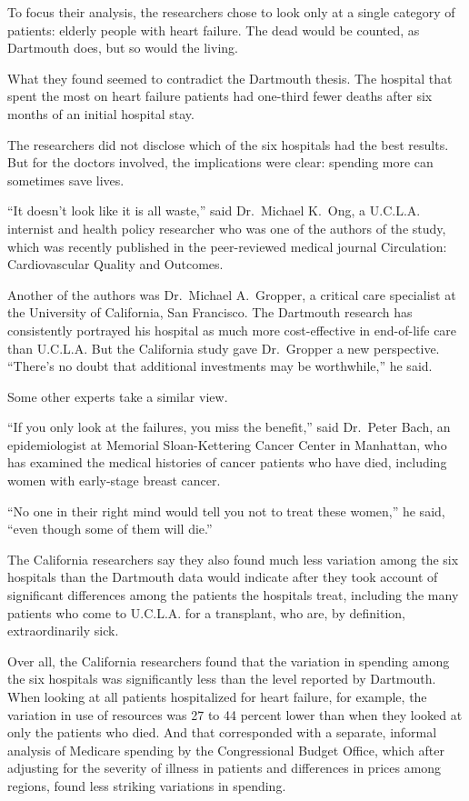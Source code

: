 ﻿\documentclass[12pt]{article}
\begin{document}
To focus their analysis, the researchers chose to look only at a single category of patients:
elderly people with heart failure. The dead would be counted, as Dartmouth does, but so would the
living.

What they found seemed to contradict the Dartmouth thesis. The hospital that spent the most on heart
failure patients had one-third fewer deaths after six months of an initial hospital stay.

The researchers did not disclose which of the six hospitals had the best results. But for the
doctors involved, the implications were clear: spending more can sometimes save lives.

``It doesn't look like it is all waste,'' said Dr.~Michael K.~Ong, a U.C.L.A. internist and health
policy researcher who was one of the authors of the study, which was recently published in the
peer-reviewed medical journal Circulation: Cardiovascular Quality and Outcomes.

Another of the authors was Dr.~Michael A.~Gropper, a critical care specialist at the University of
California, San Francisco. The Dartmouth research has consistently portrayed his hospital as much
more cost-effective in end-of-life care than U.C.L.A. But the California study gave Dr.~Gropper a
new perspective. ``There's no doubt that additional investments may be worthwhile,'' he said.

Some other experts take a similar view.

``If you only look at the failures, you miss the benefit,'' said Dr.~Peter Bach, an epidemiologist
at Memorial Sloan-Kettering Cancer Center in Manhattan, who has examined the medical histories of
cancer patients who have died, including women with early-stage breast cancer.

``No one in their right mind would tell you not to treat these women,'' he said, ``even though some
of them will die.''

The California researchers say they also found much less variation among the six hospitals than the
Dartmouth data would indicate after they took account of significant differences among the patients
the hospitals treat, including the many patients who come to U.C.L.A. for a transplant, who are, by
definition, extraordinarily sick.

Over all, the California researchers found that the variation in spending among the six hospitals
was significantly less than the level reported by Dartmouth. When looking at all patients
hospitalized for heart failure, for example, the variation in use of resources was 27 to 44 percent
lower than when they looked at only the patients who died. And that corresponded with a separate,
informal analysis of Medicare spending by the Congressional Budget Office, which after adjusting for
the severity of illness in patients and differences in prices among regions, found less striking
variations in spending.
\end{document}
